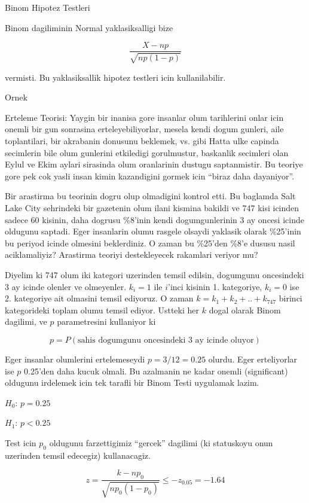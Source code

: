 \documentclass[12pt,fleqn]{article}\usepackage{../common}
\begin{document}
Binom Hipotez Testleri

Binom dagiliminin Normal yaklasiksalligi bize

$$ \frac{X-np}{\sqrt{np(1-p)}} $$

vermisti. Bu yaklasiksallik hipotez testleri icin kullanilabilir.

Ornek

Erteleme Teorisi: Yaygin bir inanisa gore insanlar olum tarihlerini onlar
icin onemli bir gun sonrasina erteleyebiliyorlar, mesela kendi dogum
gunleri, aile toplantilari, bir akrabanin donusunu beklemek, vs. gibi Hatta
ulke capinda secimlerin bile olum gunlerini etkiledigi gorulmustur,
baskanlik secimleri olan Eylul ve Ekim aylari sirasinda olum oranlarinin
dustugu saptanmistir. Bu teoriye gore pek cok yasli insan kimin kazandigini
gormek icin ``biraz daha dayaniyor''.

Bir arastirma bu teorinin dogru olup olmadigini kontrol etti. Bu baglamda
Salt Lake City sehrindeki bir gazetenin olum ilani kismina bakildi ve 747
kisi icinden sadece 60 kisinin, daha dogrusu \%8'inin kendi dogumgunlerinin
3 ay oncesi icinde oldugunu saptadi. Eger insanlarin olumu rasgele olsaydi
yaklasik olarak \%25'inin bu periyod icinde olmesini beklerdiniz. O zaman
bu \%25'den \%8'e dususu nasil aciklamaliyiz?  Arastirma teoriyi
destekleyecek rakamlari veriyor mu?

Diyelim ki 747 olum iki kategori uzerinden temsil edilsin, dogumgunu
oncesindeki 3 ay icinde olenler ve olmeyenler. $k_i=1$ ile $i$'inci kisinin
1. kategoriye, $k_i=0$ ise 2. kategoriye ait olmasini temsil ediyoruz. O
zaman $k = k_1 + k_2 + .. + k_{747}$ birinci kategorideki toplam olumu
temsil ediyor. Ustteki her $k$ dogal olarak Binom dagilimi, ve $p$
parametresini kullaniyor ki 

$$ p = P(\textrm{sahis dogumgunu oncesindeki 3 ay icinde oluyor}) $$

Eger insanlar olumlerini ertelemeseydi $p = 3/12 = 0.25$ olurdu. Eger
erteliyorlar ise $p$ 0.25'den daha kucuk olmali. Bu azalmanin ne kadar
onemli (significant) oldugunu irdelemek icin tek tarafli bir Binom Testi
uygulamak lazim. 

$H_0$: $p = 0.25$

$H_1$: $p < 0.25$

Test icin $p_0$ oldugunu farzettigimiz ``gercek'' dagilimi (ki statuskoyu
onun uzerinden temsil edecegiz) kullanacagiz. 

$$ z = \frac{k-np_0}{\sqrt{np_0(1-p_0)}} \le -z_{0.05} = -1.64 $$
\end{document}
